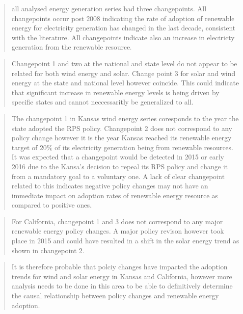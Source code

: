 \documentclass[12pt,]{article}
\begin{document}
\begin{quote}
all analysed energy generation series had three changepoints. All
changepoints occur post 2008 indicating the rate of adoption of
renewable energy for electricity generation has changed in the last
decade, consistent with the literature. All changepoints indicate also
an increase in electricty generation from the renewable resource.
\end{quote}

\begin{quote}
Changepoint 1 and two at the national and state level do not appear to
be related for both wind energy and solar. Change point 3 for solar and
wind energy at the state and national level however coincide. This could
indicate that significant increase in renewable energy levels is being
driven by specific states and cannot neccessaritly be generalized to
all.
\end{quote}

\begin{quote}
The changepoint 1 in Kansas wind energy series coresponds to the year
the state adopted the RPS policy. Changepoint 2 does not correspond to
any policy change however it is the year Kansas reached its renewable
energy target of 20\% of its electricity generation being from renewable
resources. It was expected that a changepoint would be detected in 2015
or early 2016 due to the Kansa's decision to repeal its RPS policy and
change it from a mandatory goal to a voluntary one. A lack of clear
changepoint related to this indicates negative policy changes may not
have an immediate impact on adoption rates of renewable energy resource
as compared to positive ones.
\end{quote}

\begin{quote}
For California, changepoint 1 and 3 does not correspond to any major
renewable energy policy changes. A major policy revison however took
place in 2015 and could have resulted in a shift in the solar energy
trend as shown in changepoint 2.
\end{quote}

\begin{quote}
It is therefore probable that polciy changes have impacted the adoption
trends for wind and solar energy in Kansas and California, however more
analysis needs to be done in this area to be able to definitively
determine the causal relationship between policy changes and renewable
energy adoption.
\end{quote}
\end{document}
